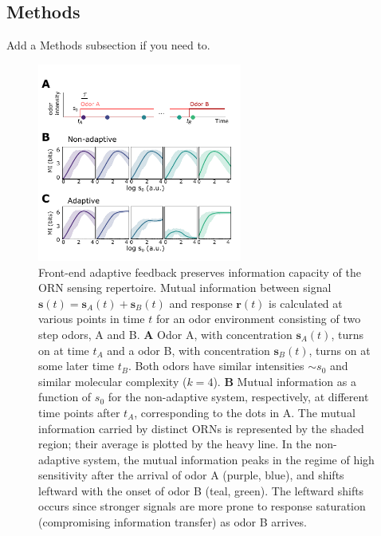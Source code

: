 \documentclass[9pt,twoside]{pnas-new}
\begin{document}
\subsection*{Methods}
Add a Methods subsection if you need to.
\fi

\begin{figure}
\centering
\includegraphics[width=0.6\textwidth]{figures/2_coding_representation_SI}
\caption{Front-end adaptive feedback preserves information capacity of the ORN sensing repertoire. Mutual information between signal $\mathbf s(t)=\mathbf s_A(t)+\mathbf s_B(t)$ and response $\mathbf r(t)$ is calculated at various points in time $t$ for an odor environment consisting of two step odors, A and B. 
\textbf{A} Odor A, with concentration $\mathbf s_A(t)$, turns on at time $t_A$ and a odor B, with concentration $\mathbf s_B(t)$, turns on at some later time $t_B$. Both odors have similar intensities $\sim s_0$ and similar molecular complexity ($k = 4$). 
\textbf{B} Mutual information as a function of $s_0$ for the non-adaptive system, respectively, at different time points after $t_A$, corresponding to the dots in A. The mutual information carried by distinct ORNs is represented by the shaded region; their average is plotted by the heavy line. In the non-adaptive system, the mutual information peaks in the regime of high sensitivity after the arrival of odor A (purple, blue), and shifts leftward with the onset of odor B (teal, green). The leftward shifts occurs since stronger signals are more prone to response saturation (compromising information transfer) as odor B arrives. 
}
\end{figure}
\end{document}
